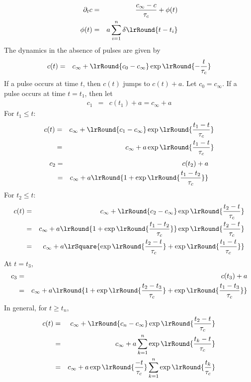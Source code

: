\documentclass[10pt]{article}
\begin{document}
\begin{eqnarray}
\partial_t c &=& \frac{c_{\infty} -c}{\tau_c}+ \phi(t)
\\
\phi(t) &=& a \sum_{i=1}^{n} \delta\lrRound{t-t_i}
\end{eqnarray}
The dynamics in the absence of pulses are given by
\begin{eqnarray}
c(t) &=& c_{\infty} + \lrRound{c_0-c_{\infty}} \exp \lrRound{-\frac{t}{\tau_c}}  
\end{eqnarray}
If a pulse occurs at time $t$, then $c(t)$ jumps to $c(t) + a$. 
Let  $c_0 = c_{\infty}$. If a pulse occurs at time $t=t_1$, then let
\begin{eqnarray}
c_1 &=& c(t_1) + a = c_{\infty} +a
\end{eqnarray}
For $t_1\leq t $:
\begin{eqnarray}
c(t) &=& c_{\infty} + \lrRound{c_1-c_{\infty}} \exp \lrRound{\frac{t_1-t}{\tau_c}} 
\\
 &=& c_{\infty} + a  \exp \lrRound{\frac{t_1-t}{\tau_c}} 
\end{eqnarray}
\begin{eqnarray*}
c_2 &=& 
c(t_2) + a 
\\
&=&
c_{\infty} + a \lrRound{1 + \exp \lrRound{\frac{t_1 -t_2}{\tau_c}} }
\end{eqnarray*}
For $t_2\leq t $:
\begin{eqnarray*}
c(t) &=& 
c_{\infty} + \lrRound{c_2-c_{\infty}} \exp \lrRound{\frac{t_2-t}{\tau_c}} 
\\
 &=& c_{\infty} + a \lrRound{1 + \exp \lrRound{\frac{t_1 -t_2}{\tau_c}} }  \exp \lrRound{\frac{t_2-t}{\tau_c}} 
 \\
 &=& c_{\infty} + a \lrSquare{\exp \lrRound{\frac{t_2-t}{\tau_c}}  + \exp \lrRound{\frac{t_1 -t}{\tau_c}} }  
\end{eqnarray*}
At $t=t_3$,
\begin{eqnarray*}
c_3 &=& 
c(t_3) + a 
\\
&=&
c_{\infty} + a \lrRound{1 + \exp \lrRound{\frac{t_2-t_3}{\tau_c}}  + \exp \lrRound{\frac{t_1 -t_3}{\tau_c}}}
\end{eqnarray*}
In general, for $t\geq t_n$,
\begin{eqnarray*}
c(t) &=& 
c_{\infty} + \lrRound{c_n -c_{\infty}} \exp \lrRound{\frac{t_2-t}{\tau_c}} 
\\
 &=& c_{\infty} + a \sum_{k=1}^{n}  \exp \lrRound{\frac{t_k -t}{\tau_c}}
 \\
 &=& c_{\infty} + a \exp \lrRound{\frac{ -t}{\tau_c}} \sum_{k=1}^{n}  \exp \lrRound{\frac{t_k }{\tau_c}}
\end{eqnarray*}
\end{document}

